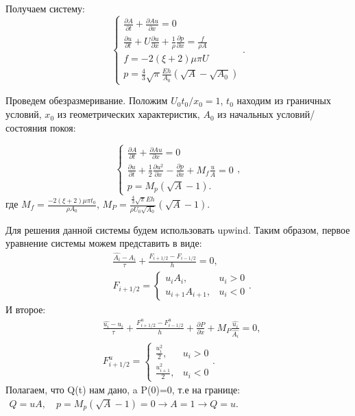 Получаем систему:
\begin{equation}
    \label{sys_of_eq}
    \begin{cases}
        \frac{\partial A}{\partial t}+\frac{\partial Au}{\partial x}=0\\
        \frac{\partial u}{\partial t}+U\frac{\partial u}{\partial x}+\frac{1}{\rho}\frac{\partial p}{\partial x}=\frac{f}{\rho A}\\
        f=-2(\xi+2)\mu\pi U\\
        p=\frac{4}{3}\sqrt{\pi}\frac{Eh}{A_0}(\sqrt{A}-\sqrt{A_0})
    \end{cases}.
    \end{equation}

Проведем обезразмеривание. Положим ${U_0 t_0}/{x_0}=1$, $t_0$ находим из граничных условий, 
$x_0$ из геометрических характеристик, $A_0$ из начальных условий/состояния покоя:

\begin{equation}
    \label{sys_of_eq1}
    \begin{cases}
        \frac{\partial A}{\partial t}+\frac{\partial Au}{\partial x}=0\\
        \frac{\partial u}{\partial t}+\frac{1}{2}\frac{\partial u^2}{\partial x}-\frac{\partial p}{\partial x}+M_f \frac{u}{A}=0\\
        p=M_p(\sqrt{A}-1).
    \end{cases},
    \end{equation}
где $M_f=\frac{-2(\xi+2)\mu \pi t_0}{\rho A_0}$, $M_P=\frac{\frac{4}{3}\sqrt{\pi}Eh}{\rho U_0\sqrt{A_0}}(\sqrt{A}-1)$.

    
Для решения данной системы будем использовать upwind. Таким образом, первое уравнение системы можем представить в виде:
$$
\begin{aligned}
    &\frac{\hat{A_i}-A_i}{\tau}+\frac{F_{i+1/2}-F_{i-1/2}}{h}=0,\\
    &F_{i+1/2}=\begin{cases}
        u_i A_i, &u_i>0\\
        u_{i+1}A_{i+1},& u_i<0
    \end{cases}.
\end{aligned}
$$
И второе:
$$
\begin{aligned}
    &\frac{\hat{u_i}-u_i}{\tau}+\frac{F_{i+1/2}^u-F_{i-1/2}^u}{h}+\frac{\partial P}{\partial x}+M_P\frac{\hat{u_i}}{\hat{A_i}}=0,\\
    &F_{i+1/2}^u=\begin{cases}
        \frac{u_i^2}{2}, &u_i>0\\
        \frac{u_{i+1}^2}{2}, &u_i<0
    \end{cases}.
\end{aligned}
$$
Полагаем, что Q(t) нам дано, a P(0)=0, т.е на границе:\\
$
\begin{aligned}
    Q=uA, \quad
    p=M_p(\sqrt{A}-1)=0\longrightarrow A=1
    \longrightarrow Q=u.
\end{aligned}
$

